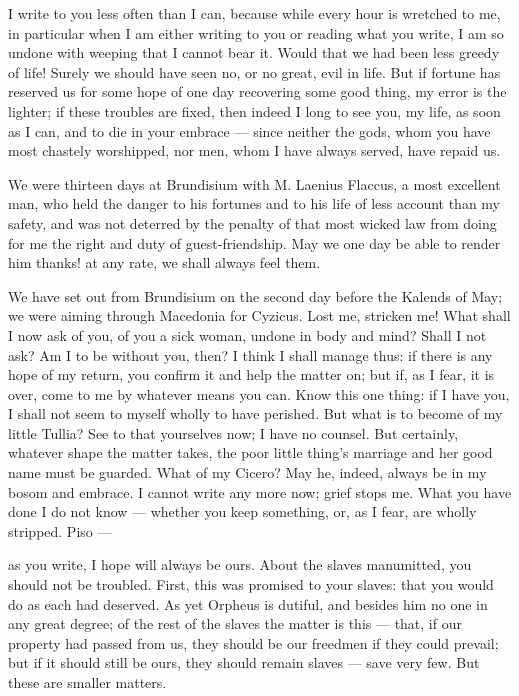 

 I write to you less often than I can, because while every hour is wretched to me, in particular when I am either writing to you or reading what you write, I am so undone with weeping that I cannot bear it. Would that we had been less greedy of life! Surely we should have seen no, or no great, evil in life. But if fortune has reserved us for some hope of one day recovering some good thing, my error is the lighter; if these troubles are fixed, then indeed I long to see you, my life, as soon as I can, and to die in your embrace --- since neither the gods, whom you have most chastely worshipped, nor men, whom I have always served, have repaid us.

 We were thirteen days at Brundisium with M. Laenius Flaccus, a most excellent man, who held the danger to his fortunes and to his life of less account than my safety, and was not deterred by the penalty of that most wicked law from doing for me the right and duty of guest-friendship. May we one day be able to render him thanks! at any rate, we shall always feel them.

 We have set out from Brundisium on the second day before the Kalends of May; we were aiming through Macedonia for Cyzicus. Lost me, stricken me! What shall I now ask of you, of you a sick woman, undone in body and mind? Shall I not ask? Am I to be without you, then? I think I shall manage thus: if there is any hope of my return, you confirm it and help the matter on; but if, as I fear, it is over, come to me by whatever means you can. Know this one thing: if I have you, I shall not seem to myself wholly to have perished. But what is to become of my little Tullia? See to that yourselves now; I have no counsel. But certainly, whatever shape the matter takes, the poor little thing's marriage and her good name must be guarded. What of my Cicero? May he, indeed, always be in my bosom and embrace. I cannot write any more now; grief stops me. What you have done I do not know --- whether you keep something, or, as I fear, are wholly stripped. Piso ---

 as you write, I hope will always be ours. About the slaves manumitted, you should not be troubled. First, this was promised to your slaves: that you would do as each had deserved. As yet Orpheus is dutiful, and besides him no one in any great degree; of the rest of the slaves the matter is this --- that, if our property had passed from us, they should be our freedmen if they could prevail; but if it should still be ours, they should remain slaves --- save very few. But these are smaller matters.

